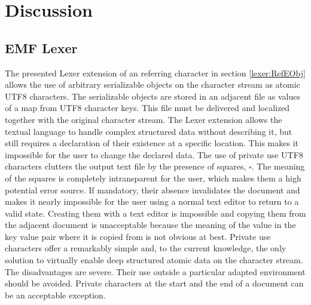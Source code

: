 \chapter{Discussion} \label{cha:discussion}
%
\section{EMF Lexer} \label{sec:EMFLexer} The presented Lexer extension of an referring character in section \ref{lexer:RefEObj} allows the use of arbitrary serializable objects on the character stream as atomic UTF8 characters. The serializable objects are stored in an adjacent file as values of a map from UTF8 character keys. This file must be delivered and localized together with the original character stream. The Lexer extension allows the textual language to handle complex structured data without describing it, but still requires a declaration of their existence at a specific location. This makes it impossible for the user to change the declared data. The use of private use UTF8 characters clutters the output text file by the presence of squares, $\square$. The meaning of the squares is completely intransparent for the user, which makes them a high potential error source. If mandatory, their absence invalidates the document and makes it nearly impossible for the user using a normal text editor to return to a valid state. Creating them with a text editor is impossible and copying them from the adjacent document is unacceptable because the meaning of the value in the key value pair where it is copied from is not obvious at best. Private use characters offer a remarkably simple and, to the current knowledge, the only solution to virtually enable deep structured atomic data on the character stream. The disadvantages are severe. Their use outside a particular adapted environment should be avoided. Private characters at the start and the end of a document can be an acceptable exception. 

